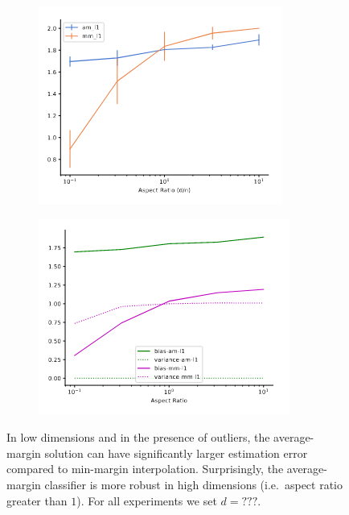 \begin{figure}[t]
\begin{subfigure}[t]{0.24\linewidth}
    \centering
    \includegraphics[width=\columnwidth]{figures/estim_err_outlier2.png}
    \label{fig:estim_err_outlier2}
    \caption{}
  \end{subfigure}
  \hfill
  \begin{subfigure}[t]{0.24\linewidth}
    \centering
    \includegraphics[width=\columnwidth]{figures/bias_variance_outlier2.png}
    \label{fig:bias_variance_outlier2}
    \caption{}
  \end{subfigure}

  \caption{In low dimensions and in the presence of outliers, the average-margin
    solution can have significantly larger estimation error compared to
    min-margin interpolation. Surprisingly, the average-margin classifier is
    more robust in high dimensions (i.e.\ aspect ratio greater than $1$). For
    all experiments we set $d=???$.} \label{fig:limitations}

\end{figure}

